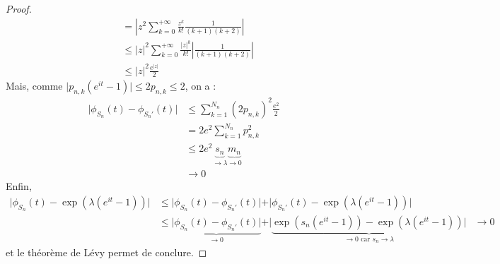\begin{proof}
\begin{align*}
      &= \left\vert z^2 \sum_{k=0}^{+\infty} \frac{z^k}{k!} \frac{1}{(k+1)(k+2)} \right\vert \\
      &\leq \vert z \vert^2 \sum_{k=0}^{+\infty} \frac{\vert z \vert^k}{k!} \left| \frac{1}{(k+1)(k+2)} \right| \\
      &\leq \vert z \vert^2 \frac{e^{\vert z \vert}}{2}
    \end{align*}
    Mais, comme $\vert p_{n,k}(e^{it} - 1) \vert \leq 2 p_{n,k} \leq 2$, on a :
    \begin{align*}
      \vert \phi_{S_n}(t) - \phi_{S_n'}(t) \vert &\leq \sum_{k=1}^{N_n} (2p_{n,k})^2 \frac{e^2}{2} \\
      &= 2e^2 \sum_{k=1}^{N_n} p_{n,k}^2 \\
      &\leq 2e^2 \underbrace{s_n}_{\longrightarrow \lambda} \underbrace{m_n}_{\longrightarrow 0} \\
      &\longrightarrow 0
    \end{align*}
    Enfin,
    \begin{align*}
      \vert \phi_{S_n}(t) - \exp(\lambda(e^{it} - 1)) \vert &\leq \vert \phi_{S_n}(t) - \phi_{S_n'}(t) \vert + \vert \phi_{S_n'}(t) - \exp(\lambda(e^{it} - 1)) \vert \\
      &\leq \underbrace{\vert \phi_{S_n}(t) - \phi_{S_n'}(t) \vert}_{\longrightarrow 0} + \vert \underbrace{\exp(s_n(e^{it} - 1)) - \exp(\lambda(e^{it} - 1)) \vert}_{\longrightarrow 0 \text{ car } s_n \longrightarrow \lambda}
      &\longrightarrow 0
    \end{align*}
    et le théorème de Lévy permet de conclure.
  \end{proof}

